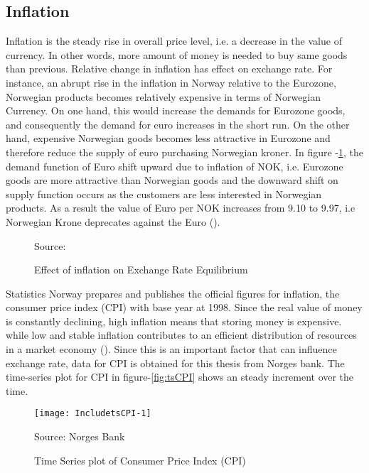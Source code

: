 \documentclass[12pt, lot, lof]{thesis}\usepackage[]{graphicx}\usepackage[]{color}
\makeatletter
\def\maxwidth{ %
  \ifdim\Gin@nat@width>\linewidth
    \linewidth
  \else
    \Gin@nat@width
  \fi
}
\makeatother
\begin{document}
\subsection{Inflation}
\label{ssec:inflation}
Inflation is the steady rise in overall price level, i.e. a decrease in the value of currency. In other words, more amount of money is needed to buy same goods than previous. Relative change in inflation has effect on exchange rate. For instance, an abrupt rise in the inflation in Norway relative to the Eurozone, Norwegian products becomes relatively expensive in terms of Norwegian Currency. On one hand, this would increase the demands for Eurozone goods, and consequently the demand for euro increases in the short run. On the other hand, expensive Norwegian goods becomes less attractive in Eurozone and therefore reduce the supply of euro purchasing Norwegian kroner. In figure -\ref{fig:inflationEffect}, the demand function of Euro shift upward due to inflation of NOK, i.e. Eurozone goods are more attractive than Norwegian goods and the downward shift on supply  function occurs as the customers are less interested in Norwegian products. As a result the value of Euro per NOK increases from 9.10 to 9.97, i.e Norwegian Krone deprecates against the Euro (\cite[p.~104]{madura2012international}).

\begin{figure}[htbp]
\centering
    
    \flushright\scriptsize{Source: \cite{madura2012international}}
    \caption{Effect of inflation on Exchange Rate Equilibrium}
    \label{fig:inflationEffect}
\end{figure}

Statistics Norway prepares and publishes the official figures for inflation, the consumer price index (CPI) with base year at 1998. Since the real value of money is constantly declining, high inflation means that storing money is expensive. while low and stable inflation contributes to an efficient distribution of resources in a market economy (\cite{NorgesBank2007faq}). Since this is an important factor that can influence exchange rate, data for CPI is obtained for this thesis from Norges bank. The time-series plot for CPI in figure-\ref{fig:tsCPI} shows an steady increment over the time. 

\begin{figure} 
\begin{Schunk}


{\centering \texttt{[image: IncludetsCPI-1]} 

}

\end{Schunk}
\flushright\scriptsize{Source: Norges Bank}
\caption{Time Series plot of Consumer Price Index (CPI)}
\end{figure}
\end{document}
